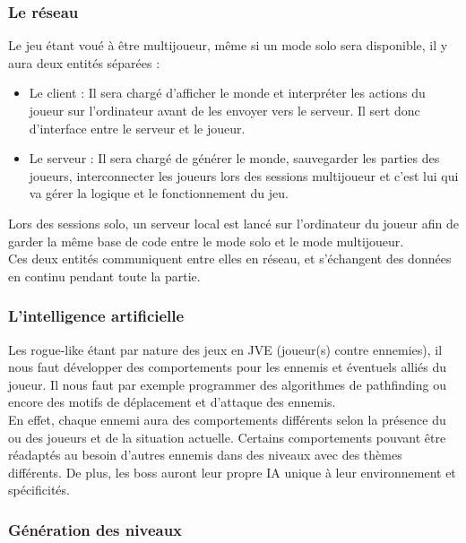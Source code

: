 \documentclass{article}
\begin{document}
\subsubsection{Le réseau}

Le jeu étant voué à être multijoueur, même si un mode solo sera disponible, il y aura deux entités séparées :

\begin{itemize}
    \item Le client :  Il sera chargé d'afficher le monde et interpréter les actions du joueur sur l'ordinateur avant de les envoyer vers le serveur. Il sert donc d'interface entre le serveur et le joueur.
    
    \item Le serveur : Il sera chargé de générer le monde, sauvegarder les parties des joueurs, interconnecter les joueurs lors des sessions multijoueur et c'est lui qui va gérer la logique et le fonctionnement du jeu.
\end{itemize}

Lors des sessions solo, un serveur local est lancé sur l'ordinateur du joueur afin de garder la même base de code entre le mode solo et le mode multijoueur. \\
Ces deux entités communiquent entre elles en réseau, et s'échangent des données en continu pendant toute la partie.

\subsubsection{L'intelligence artificielle}

Les rogue-like étant par nature des jeux en JVE (joueur(s) contre ennemies), il nous faut développer des comportements pour les ennemis et éventuels alliés du joueur. Il nous faut par exemple programmer des algorithmes de pathfinding ou encore des motifs de déplacement et d'attaque des ennemis. \\
En effet, chaque ennemi aura des comportements différents selon la présence du ou des joueurs et de la situation actuelle. Certains comportements pouvant être réadaptés au besoin d'autres ennemis dans des niveaux avec des thèmes différents. De plus, les boss auront leur propre IA unique à leur environnement et spécificités.

\subsubsection{Génération des niveaux}
\end{document}
